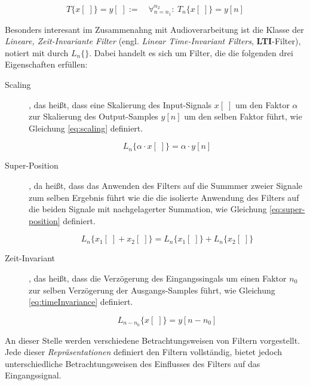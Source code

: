  \begin{equation}
T \{ x[\;] \} = y[\;] := \quad \mathop{\forall}_{n = n_1}^{n_2} :\ T_n\{x[\;]\} = y[n]
\label{eq:TransformationOperator}
\end{equation}


Besonders interesant im Zusammenahng mit Audioverarbeitung ist die Klasse der \emph{Lineare, Zeit-Invariante Filter} (engl. \emph{Linear Time-Invariant Filters}, \textbf{LTI}-Filter), notiert mit durch $L_n\{  \}$. Dabei handelt es sich um Filter, die die folgenden drei Eigenschaften erfüllen:

\begin{description}
	\item[Scaling], das heißt, dass eine Skalierung des Input-Signals $x[\;]$ um den Faktor $\alpha$ zur Skalierung des Output-Samples $y[n]$ um den selben Faktor führt, wie Gleichung \ref{eq:scaling} definiert.
	
	 \begin{equation}
	L_n\{ \alpha \cdot x[\;] \} = \alpha \cdot y[n]
	\label{eq:scaling}
	\end{equation}
	
	\item[Super-Position], da heißt, dass das Anwenden des Filters auf die Summmer zweier Signale zum selben Ergebnis führt wie die die isolierte Anwendung des Filters auf die beiden Signale mit nachgelagerter Summation, wie Gleichung \ref{eq:super-position} definiert. \cite[\glqq Linear Filters\grqq ]{introductionToFilters}
	
	 \begin{equation}
	L_n\{ x_1[\;] + x_2[\;] \} = L_n\{ x_1[\;]\}  + L_n\{ x_2[\;]\}
	\label{eq:super-position}
	\end{equation}
	
	\item[Zeit-Invariant], das heißt, dass die Verzögerung des Eingangssingals um einen Faktor $n_0$ zur selben Verzögerung der Ausgangs-Samples führt, wie Gleichung \ref{eq:timeInvariance} definiert.\cite[Filters III, S. 2 - 5 ]{dspMichiganSystems}
	
	 \begin{equation}
		L_{n-n_0}\{ x[\;] \} = y[n-n_0]
	\label{eq:timeInvariance}
	\end{equation}
	
\end{description}

An dieser Stelle werden verschiedene Betrachtungsweisen von Filtern vorgestellt. Jede dieser \emph{Repräsentationen} definiert den Filtern vollständig, bietet jedoch unterschiedliche Betrachtungsweisen des Einflusses des Filters auf das Eingangssignal. \cite[Filters III, S. 1 ]{dspMichiganSystems}

